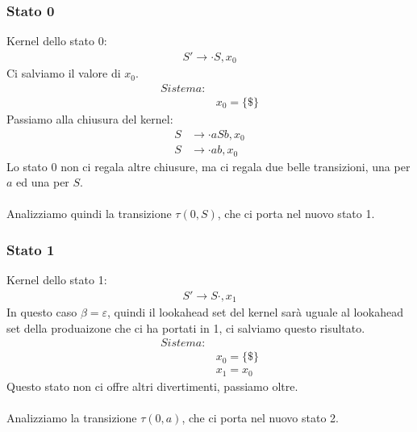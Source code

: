 \documentclass[class=book, crop=false, oneside, 12pt]{standalone}
\begin{document}
\subsubsection*{Stato 0}
Kernel dello stato 0:
\begin{align*}
    S' \to \cdot S, x_0
\end{align*}
Ci salviamo il valore di \(x_0\).
\begin{align*}
    Sistema:& \\
            & x_0 = \{\$\}
\end{align*} 
Passiamo alla chiusura del kernel:
\begin{align*}
    S &\to \cdot aSb, x_0 \\
    S &\to \cdot ab, x_0
\end{align*}
Lo stato 0 non ci regala altre chiusure, ma ci regala due belle transizioni, una per \(a\) ed una per \(S\).
\\\\
Analizziamo quindi la transizione \(\tau(0,S)\), che ci porta nel nuovo stato 1.
\subsubsection*{Stato 1}
Kernel dello stato 1:
\begin{align*}
    S' \to S \cdot, x_1
\end{align*}
In questo caso \(\beta = \varepsilon\), quindi il lookahead set del kernel sarà uguale al lookahead set della produaizone che ci ha portati in 1, ci salviamo questo risultato.
\begin{align*}
    Sistema:& \\
            & x_0 = \{\$\}\\
            & x_1 = x_0
\end{align*}
Questo stato non ci offre altri divertimenti, passiamo oltre.
\\\\
Analizziamo la transizione \(\tau(0,a)\), che ci porta nel nuovo stato 2.
\end{document}
